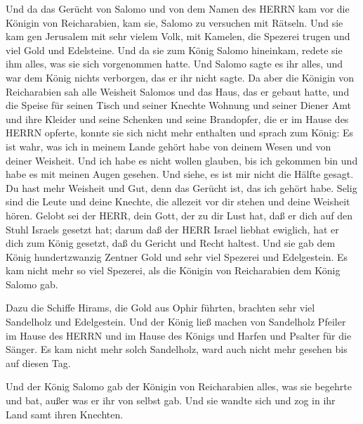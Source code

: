  Und da das Gerücht von Salomo und von dem Namen des HERRN
kam vor die Königin von Reicharabien, kam sie, Salomo zu versuchen mit
Rätseln.  Und sie kam gen Jerusalem mit sehr vielem Volk,
mit Kamelen, die Spezerei trugen und viel Gold und Edelsteine. Und da
sie zum König Salomo hineinkam, redete sie ihm alles, was sie sich
vorgenommen hatte.  Und Salomo sagte es ihr alles, und war
dem König nichts verborgen, das er ihr nicht sagte.  Da aber
die Königin von Reicharabien sah alle Weisheit Salomos und das Haus, das
er gebaut hatte,  und die Speise für seinen Tisch und seiner
Knechte Wohnung und seiner Diener Amt und ihre Kleider und seine
Schenken und seine Brandopfer, die er im Hause des HERRN opferte, konnte
sie sich nicht mehr enthalten  und sprach zum König: Es ist
wahr, was ich in meinem Lande gehört habe von deinem Wesen und von
deiner Weisheit.  Und ich habe es nicht wollen glauben, bis
ich gekommen bin und habe es mit meinen Augen gesehen. Und siehe, es ist
mir nicht die Hälfte gesagt. Du hast mehr Weisheit und Gut, denn das
Gerücht ist, das ich gehört habe.  Selig sind die Leute und
deine Knechte, die allezeit vor dir stehen und deine Weisheit hören.
 Gelobt sei der HERR, dein Gott, der zu dir Lust hat, daß er
dich auf den Stuhl Israels gesetzt hat; darum daß der HERR Israel
liebhat ewiglich, hat er dich zum König gesetzt, daß du Gericht und
Recht haltest.  Und sie gab dem König hundertzwanzig
Zentner Gold und sehr viel Spezerei und Edelgestein. Es kam nicht mehr
so viel Spezerei, als die Königin von Reicharabien dem König Salomo gab.

 Dazu die Schiffe Hirams, die Gold aus Ophir führten,
brachten sehr viel Sandelholz und Edelgestein.  Und der
König ließ machen von Sandelholz Pfeiler im Hause des HERRN und im Hause
des Königs und Harfen und Psalter für die Sänger. Es kam nicht mehr
solch Sandelholz, ward auch nicht mehr gesehen bis auf diesen Tag.

 Und der König Salomo gab der Königin von Reicharabien
alles, was sie begehrte und bat, außer was er ihr von selbst gab. Und
sie wandte sich und zog in ihr Land samt ihren Knechten.

